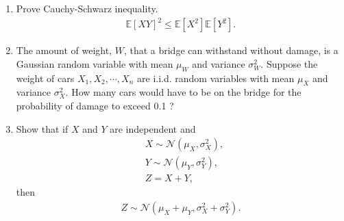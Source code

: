 \documentclass{article}
\begin{document}
\begin{enumerate}
\begin{enumerate}
\end{enumerate}
\item Prove Cauchy-Schwarz inequality. 
	\begin{align*}
	\mathbb{E}[XY]^2\leq \mathbb{E}[X^2]\mathbb{E}[Y^2].	
	\end{align*}

\item The amount of weight, $W$, that a bridge can withstand without damage, is a Gaussian random variable with mean $\mu_W$ and variance $\sigma_W^2$. 
Suppose the weight of cars $X_1,X_2,\cdots,X_n$ are i.i.d. random variables with mean $\mu_X$ and variance $\sigma_X^2$.
How many cars would have to be on the bridge for the probability of damage to exceed 0.1 ?

\item Show that if $X$ and $Y$ are independent and 
	\begin{align*}
	&X\sim\mathcal{N}(\mu_X,\sigma_X^2),\\
	&Y\sim\mathcal{N}(\mu_Y,\sigma_Y^2),\\
	&Z=X+Y,	
	\end{align*}
then 
	\begin{align*}
	Z\sim\mathcal{N}(\mu_X+\mu_Y,\sigma_X^2+\sigma_Y^2).	
	\end{align*}


\end{enumerate}
\end{document}
